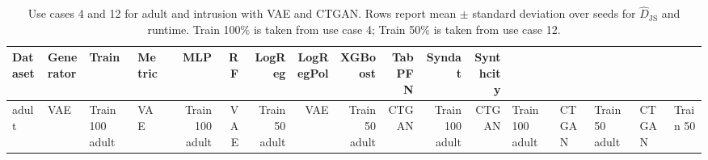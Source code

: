 \begin{table}[ht]
\centering
\scriptsize
\setlength{\tabcolsep}{2.2pt}
\caption{Use cases 4 and 12 for adult and intrusion with VAE and CTGAN. Rows report mean $\pm$ standard deviation over seeds for $\widehat{D}_{\mathrm{JS}}$ and runtime. Train 100\% is taken from use case 4; Train 50\% is taken from use case 12.}
\label{tab:uc4_uc12_adult_intrusion_vae_ctgan_mean_std}
\begin{tabular}{llllrrrrrrrr}
\toprule
Dataset & Generator & Train & Metric & MLP & RF & LogReg & LogRegPol & XGBoost & TabPFN & Syndat & Synthcity \\
\midrule
adult & VAE & Train 100%
adult & VAE & Train 100%
adult & VAE & Train 50%
adult & VAE & Train 50%
adult & CTGAN & Train 100%
adult & CTGAN & Train 100%
adult & CTGAN & Train 50%
adult & CTGAN & Train 50%

\end{tabular}
\end{table}

